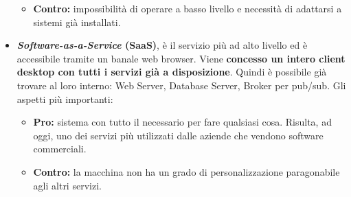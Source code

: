 \documentclass[a4paper]{article}
\begin{document}
\begin{itemize}
\begin{itemize}
			\item \textcolor{Red4}{\textbf{Contro:}} impossibilità di operare a basso livello e necessità di adattarsi a sistemi già installati.
		\end{itemize}
		
		\item \textcolor{Red3}{\textbf{\emph{Software-as-a-Service} (SaaS)}}, è il servizio più ad alto livello ed è accessibile tramite un banale web browser. Viene \textbf{concesso un intero client desktop con tutti i servizi già a disposizione}. Quindi è possibile già trovare al loro interno: Web Server, Database Server, Broker per pub/sub. Gli aspetti più importanti:
		\begin{itemize}
			\item \textcolor{Green4}{\textbf{Pro:}} sistema con tutto il necessario per fare qualsiasi cosa. Risulta, ad oggi, uno dei servizi più utilizzati dalle aziende che vendono software commerciali.
			
			\item \textcolor{Red4}{\textbf{Contro:}} la macchina non ha un grado di personalizzazione paragonabile agli altri servizi.
		\end{itemize}
	\end{itemize}\newpage
	
\end{document}
